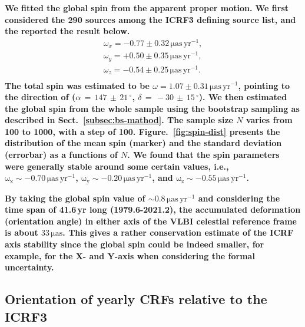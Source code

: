 \documentclass{aa}
\begin{document}
    \textbf{We fitted the global spin from the apparent proper motion.
    We first considered the 290 sources among the ICRF3 defining source list, and the reported the result below.
    \begin{equation} \label{eq:spin-from-def}
         \begin{array}{l}
             \omega_x = -0.77 \pm 0.32\,\mathrm{\mu as\,yr^{-1}}, \\
             \omega_y = +0.50 \pm 0.35\,\mathrm{\mu as\,yr^{-1}}, \\
             \omega_z = -0.54 \pm 0.25\,\mathrm{\mu as\,yr^{-1}}. \\
         \end{array}
    \end{equation}
    The total spin was estimated to be $\omega = 1.07 \pm 0.31\,\mathrm{\mu as\,yr^{-1}}$, pointing to the direction of ($\alpha\,=\,147\,\pm\,21\,^{\circ}$, $\delta\,=\,-30\,\pm\,15\,^{\circ}$).
    We then estimated the global spin from the whole sample using the bootstrap sampling as described in Sect.~\ref{subsec:bs-mathod}.
    The sample size $N$ varies from 100 to 1000, with a step of 100.
    Figure.~\ref{fig:spin-dist} presents the distribution of the mean spin (marker) and the standard deviation (errorbar) as a functions of $N$.
    We found that the spin parameters were generally stable around some certain values, i.e., $\mathrm{\omega_x\sim-0.70\,\mu as\,yr^{-1}}$,  $\mathrm{\omega_y\sim-0.20\,\mu as\,yr^{-1}}$, and  $\mathrm{\omega_z\sim-0.55\,\mu as\,yr^{-1}}$.}
    
    \textbf{By taking the global spin value of $\mathrm{\sim 0.8\,\mu as\,yr^{-1}}$ and considering the time span of 41.6\,yr long (1979.6-2021.2), the accumulated deformation (orientation angle) in either axis of the VLBI celestial reference frame is about $\mathrm{33\,\mu as}$.
    This gives a rather conservation estimate of the ICRF axis stability since the global spin could be indeed smaller, for example, for the X- and Y-axis when considering the formal uncertainty.}


\subsection{Orientation of yearly CRFs relative to the ICRF3}  \label{subsec:orient-from-yearly-crf}
    
\end{document}
